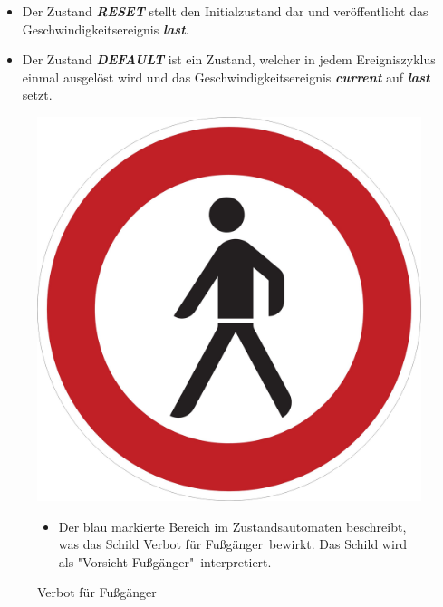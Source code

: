 \begin{itemize}
	\item Der Zustand \textbf{\textit{RESET}} stellt den Initialzustand dar und ver\"offentlicht das Geschwindigkeitsereignis \textbf{\textit{last}}.
	
	\item Der Zustand \textbf{\textit{DEFAULT}} ist ein Zustand, welcher in jedem Ereigniszyklus einmal ausgel\"ost wird und das Geschwindigkeitsereignis \textbf{\textit{current}} auf \textbf{\textit{last}} setzt.
	
\end{itemize}


\begin{figure}[h]
	\begin{minipage}[t]{4cm}
		\vspace{0pt}
		\centering
		\includegraphics[scale=0.07]{images/PED.jpg}
		\caption{Verbot f\"ur Fu\ss{}g\"anger}
		\label{fig:PED}
	\end{minipage}
	\hfill
	\begin{minipage}[t]{10cm}
		\vspace{0pt}
		\begin{itemize}
			\item Der blau markierte Bereich im Zustandsautomaten beschreibt, was das Schild \glqq Verbot f\"ur Fu\ss{}g\"anger\grqq \ bewirkt. Das Schild wird als "Vorsicht Fu\ss{}g\"anger"\  interpretiert.
			

\end{itemize}
\end{minipage}
\end{figure}
